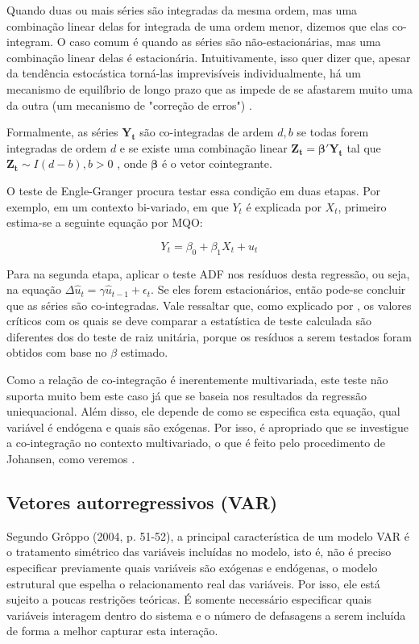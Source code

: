 \documentclass[a4paper,
               article,
               12pt,
               openany,
               oneside,
               english,
               brazil]{abntex2}
\numberwithin{equation}{section}
\begin{document}
    Quando duas ou mais séries são integradas da mesma ordem, mas uma combinação linear delas for integrada de uma ordem menor, dizemos que elas co-integram. O caso comum é quando as séries são não-estacionárias, mas uma combinação linear delas é estacionária. Intuitivamente, isso quer dizer que, apesar da tendência estocástica torná-las imprevisíveis individualmente, há um mecanismo de equilíbrio de longo prazo que as impede de se afastarem muito uma da outra (um mecanismo de "correção de erros") \cite[p.~46]{gustavo}.

    Formalmente, as séries $ \mathbf{Y_t} $ são co-integradas de ardem $ d, b $ se todas forem integradas de ordem $ d $ e se existe uma combinação linear $ \mathbf{Z_t} = \pmb{\beta}'\mathbf{Y_t} $ tal que $ \mathbf{Z_t} \sim I(d - b), b > 0 $ \cite[p.~245]{lutkepool}, onde $ \pmb{\beta} $ é o vetor cointegrante.

    O teste de Engle-Granger procura testar essa condição em duas etapas. Por exemplo, em um contexto bi-variado, em que $ Y_t $ é explicada por $ X_t $, primeiro estima-se a seguinte equação por MQO:

    $$  Y_t = \beta_0 + \beta_1 X_t + u_t \label{engle-granger}$$

    Para na segunda etapa, aplicar o teste ADF nos resíduos desta regressão, ou seja, na equação $ \Delta \hat{u}_t = \gamma \hat{u}_{t-1} + \epsilon_{t} $. Se eles forem estacionários, então pode-se concluir que as séries são co-integradas. Vale ressaltar que, como explicado por \textcite[p.~756]{gujarati}, os valores críticos com os quais se deve comparar a estatística de teste calculada são diferentes dos do teste de raiz unitária, porque os resíduos a serem testados foram obtidos com base no $ \beta $ estimado.

    Como a relação de co-integração é inerentemente multivariada, este teste não suporta muito bem este caso já que se baseia nos resultados da regressão uniequacional. Além disso, ele depende de como se especifica esta equação, qual variável é endógena e quais são exógenas. Por isso, é apropriado que se investigue a co-integração no contexto multivariado, o que é feito pelo procedimento de Johansen, como veremos \cite[p.~3]{coint2}.

    \subsection{Vetores autorregressivos (VAR)}

    Segundo Grôppo (2004, p. 51-52), a principal característica de um modelo VAR é o tratamento simétrico das variáveis incluídas no modelo, isto é, não é preciso especificar previamente quais variáveis são exógenas e endógenas, o modelo estrutural que espelha o relacionamento real das variáveis. Por isso, ele está sujeito a poucas restrições teóricas. É somente necessário especificar quais variáveis interagem dentro do sistema e o número de defasagens a serem incluída de forma a melhor capturar esta interação.
    
\end{document}
